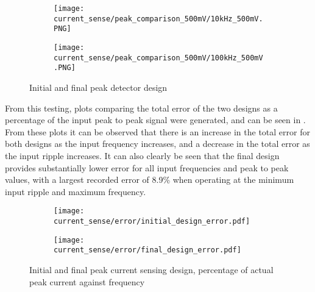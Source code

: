 \begin{figure}[H]
    \centering
    \begin{subfigure}{0.45\textwidth}
        \texttt{[image: current\_sense/peak\_comparison\_500mV/10kHz\_500mV.PNG]}
    \end{subfigure}
    \begin{subfigure}{0.45\textwidth}
        \texttt{[image: current\_sense/peak\_comparison\_500mV/100kHz\_500mV.PNG]}
    \end{subfigure}
    \caption{Initial and final peak detector design }
    \vspace{-10pt}
    \label{F:peak_detect_scope}
\end{figure}

From this testing, plots comparing the total error of the two designs as a percentage of the input peak to peak signal were generated, and can be seen in . From these plots it can be observed that there is an increase in the total error for both designs as the input frequency increases, and a decrease in the total error as the input ripple increases. It can also clearly be seen that the final design provides substantially lower error for all input frequencies and peak to peak values, with a largest recorded error of 8.9\% when operating at the minimum input ripple and maximum frequency.   

\begin{figure}[H]
    \centering
    \begin{subfigure}{0.45\textwidth}
        \texttt{[image: current\_sense/error/initial\_design\_error.pdf]}
    \end{subfigure}
    \begin{subfigure}{0.45\textwidth}
        \texttt{[image: current\_sense/error/final\_design\_error.pdf]}
    \end{subfigure}
    \caption{Initial and final peak current sensing design, percentage of actual peak current against frequency}
    \vspace{-10pt}
    \label{F:peak_detect_eval}
\end{figure}

